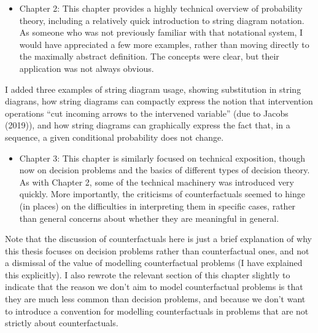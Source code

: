 \documentclass[12pt, a4paper]{article}
\begin{document}
\begin{itemize}
    \item Chapter 2: This chapter provides a highly technical overview of probability theory, including a relatively quick introduction to string diagram notation. As someone who was not previously familiar with that notational system, I would have appreciated a few more examples, rather than moving directly to the maximally abstract definition. The concepts were clear, but their application was not always obvious.
\end{itemize}

I added three examples of string diagram usage, showing substitution in string diagrans, how string diagrams can compactly express the notion that intervention operations ``cut incoming arrows to the intervened variable'' (due to Jacobs (2019)), and how string diagrams can graphically express the fact that, in a sequence, a given conditional probability does not change.

\begin{itemize}
    \item Chapter 3: This chapter is similarly focused on technical exposition, though now on decision problems and the basics of different types of decision theory. As with Chapter 2, some of the technical machinery was introduced very quickly. More importantly, the criticisms of counterfactuals seemed to hinge (in places) on the difficulties in interpreting them in specific cases, rather than general concerns about whether they are meaningful in general.
\end{itemize}

Note that the discussion of counterfactuals here is just a brief explanation of why this thesis focuses on decision problems rather than counterfactual ones, and not a dismissal of the value of modelling counterfactual problems (I have explained this explicitly). I also rewrote the relevant section of this chapter slightly to indicate that the reason we don't aim to model counterfactual problems is that they are much less common than decision problems, and because we don't want to introduce a convention for modelling counterfactuals in problems that are not strictly about counterfactuals.
\end{document}
